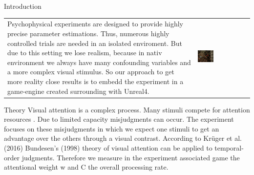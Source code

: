 \documentclass[a0paper,portrait]{baposter}
\begin{document}
\begin{poster}
{}



\begin{posterbox}[name=intro,span=2,column=0,row=0]{Introduction}
\begin{tabular}{p{} p{}}
    Psychophysical experiments are designed to provide highly precise parameter estimations. Thus, numerous highly controlled trials are needed in an isolated enviroment. But due to this setting we lose realism, because in nativ environment we always have many confounding variables and a more complex visual stimulus.
    So our approach to get more reality close results is to embedd the experiment in a game-engine created  	surrounding with Unreal4.
    & 
    \vspace{-8pt}
    \includegraphics[width=0.32\textwidth]{race2.png}\\
\end{tabular}

\end{posterbox}

\begin{posterbox}[name=theory,column=0,row=1,below=intro]{Theory}
Visual attention is a complex process. Many stimuli compete for attention resources . Due to limited capacity misjudgments can occur. The experiment focuses on these misjudgments in which we expect one stimuli to get an advantage over the others through a visual contrast. According to Krüger et al. (2016) Bundesen's (1998) theory of visual attention can be applied to temporal-order judgments. Therefore we measure in the experiment associated game the attentional weight w and C the overall processing rate. 
\end{posterbox}


\end{poster}
\end{document}
